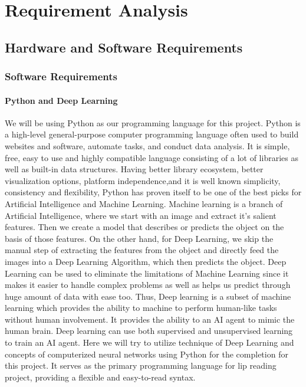       \chapter{Requirement Analysis}
      \section{Hardware and Software Requirements}
	\subsection{Software Requirements}
 	\subsubsection{Python and Deep Learning}
We will be using Python as our programming language for this project. Python is a high-level general-purpose computer programming language often used to build websites and software, automate tasks, and conduct data analysis. It is simple, free, easy to use and highly compatible language consisting of a lot of libraries as well as built-in data structures. Having better library ecosystem, better visualization options, platform independence,and it is well known simplicity, consistency and flexibility, Python has proven itself to be one of the best picks for Artificial Intelligence and Machine Learning. Machine learning is a branch of Artificial Intelligence, where we start with an image and extract it’s salient features. Then we create a model that describes or predicts the object on the basis of those features. On the other hand, for Deep Learning, we skip the manual step of extracting the features from the object and directly feed the images into a Deep Learning Algorithm, which then predicts the object. Deep Learning can be used to eliminate the limitations of Machine Learning since it makes it easier to handle complex problems as well as helps us predict through huge amount of data with ease too. Thus, Deep learning is a subset of machine learning which provides the ability to machine to perform human-like tasks without human involvement. It provides the ability to an AI agent to mimic the human brain. Deep learning can use both supervised and unsupervised learning to train an AI agent. Here we will try to utilize technique of Deep Learning and concepts of computerized neural networks using Python for the completion for this project. It serves as the primary programming language for  lip reading project, providing a flexible and easy-to-read syntax.

